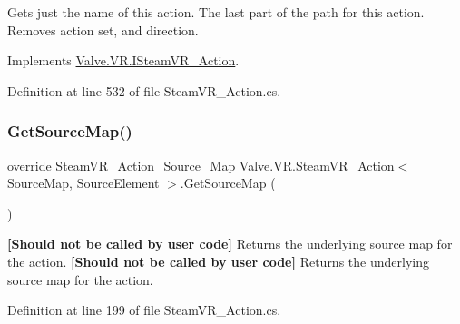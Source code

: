 Gets just the name of this action. The last part of the path for this action. Removes action set, and direction. 



Implements \mbox{\hyperlink{interface_valve_1_1_v_r_1_1_i_steam_v_r___action_ae21f01096754a807c68543f61e63bf1c}{Valve.\+V\+R.\+I\+Steam\+V\+R\+\_\+\+Action}}.



Definition at line 532 of file Steam\+V\+R\+\_\+\+Action.\+cs.

\mbox{\label{class_valve_1_1_v_r_1_1_steam_v_r___action_a948d9db18a20fde79dd442cd0e119fa6}} 
\subsubsection{\texorpdfstring{GetSourceMap()}{GetSourceMap()}\hspace{0.1cm}{\footnotesize\ttfamily [1/2]}}
{\footnotesize\ttfamily override \mbox{\hyperlink{class_valve_1_1_v_r_1_1_steam_v_r___action___source___map}{Steam\+V\+R\+\_\+\+Action\+\_\+\+Source\+\_\+\+Map}} \mbox{\hyperlink{class_valve_1_1_v_r_1_1_steam_v_r___action}{Valve.\+V\+R.\+Steam\+V\+R\+\_\+\+Action}}$<$ Source\+Map, Source\+Element $>$.Get\+Source\+Map (\begin{DoxyParamCaption}{ }\end{DoxyParamCaption})}



{\bfseries{\mbox{[}Should not be called by user code\mbox{]}}} Returns the underlying source map for the action. {\bfseries{\mbox{[}Should not be called by user code\mbox{]}}} Returns the underlying source map for the action. 



Definition at line 199 of file Steam\+V\+R\+\_\+\+Action.\+cs.

\mbox{\label{class_valve_1_1_v_r_1_1_steam_v_r___action_a59d2546a9c1a9097e2243e1537f1bfe3}} 
